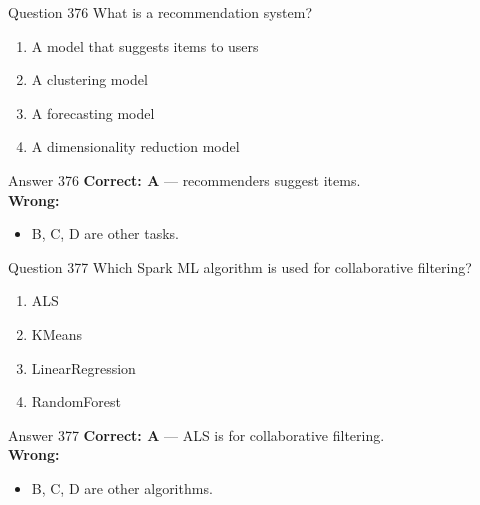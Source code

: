 \documentclass[aspectratio=169,11pt]{beamer}
\begin{document}
	\begin{frame}{Question 376}
		What is a recommendation system?
		\begin{enumerate}[label=\Alph*.]
			\item A model that suggests items to users
			\item A clustering model
			\item A forecasting model
			\item A dimensionality reduction model
		\end{enumerate}
	\end{frame}
	\begin{frame}{Answer 376}
		\textbf{Correct: A} --- recommenders suggest items.\\
		\vspace{0.5em}
		\textbf{Wrong:}
		\begin{itemize}
			\item B, C, D are other tasks.
		\end{itemize}
	\end{frame}
	
	\begin{frame}{Question 377}
		Which Spark ML algorithm is used for collaborative filtering?
		\begin{enumerate}[label=\Alph*.]
			\item ALS
			\item KMeans
			\item LinearRegression
			\item RandomForest
		\end{enumerate}
	\end{frame}
	\begin{frame}{Answer 377}
		\textbf{Correct: A} --- ALS is for collaborative filtering.\\
		\vspace{0.5em}
		\textbf{Wrong:}
		\begin{itemize}
			\item B, C, D are other algorithms.
		\end{itemize}
	\end{frame}
	
\end{document}
